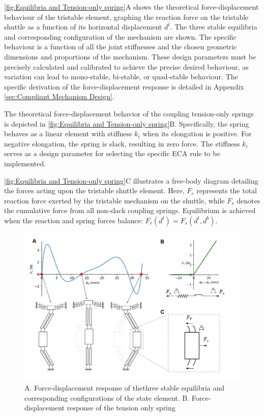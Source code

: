 \autoref*{fig:Equilibria and Tension-only spring}A shows the theoretical force-displacement behaviour of the tristable element, graphing the reaction force on the tristable shuttle as a function of its horizontal displacement \(d^t\). The three stable equilibria and corresponding configuration of the mechanism are shown. 
The specific behaviour is a function of all the joint stiffnesses and the chosen geometric dimensions and proportions of the mechanism. These design parameters must be precisely calculated and calibrated to achieve the precise desired behaviour, as variation can lead to mono-stable, bi-stable, or quad-stable behaviour. The specific derivation of the force-displacement response is detailed in Appendix \ref*{sec:Compliant Mechanism Design}.


The theoretical force-displacement behavior of the coupling tension-only springs is depicted in \autoref*{fig:Equilibria and Tension-only spring}B. Specifically, the spring behaves as a linear element with stiffness \( k_i \) when its elongation is positive. For negative elongation, the spring is slack, resulting in zero force. The stiffness \( k_i \) serves as a design parameter for selecting the specific ECA rule to be implemented.

\autoref*{fig:Equilibria and Tension-only spring}C illustrates a free-body diagram detailing the forces acting upon the tristable shuttle element. Here, \( F_r \) represents the total reaction force exerted by the tristable mechanism on the shuttle, while \( F_s \) denotes the cumulative force from all non-slack coupling springs. Equilibrium is achieved when the reaction and spring forces balance: \( F_r(d^t) = F_s(d^t, d^b) \). 

\begin{figure}[h]
    \centering
    \includegraphics[width=\textwidth]{images/SVGs/Equilibria1.pdf}
    \caption{A. Force-displacement response of thethree stable equilibria and corresponding configurations of the state element. B. Force-displacement response of the tension only spring }
    \label{fig:Equilibria and Tension-only spring}

\end{figure}



